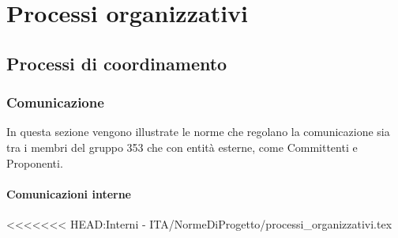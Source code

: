 \documentclass[NormeDiProgetto.tex]{subfiles}
\begin{document}
	\chapter{Processi organizzativi}

	\section{Processi di coordinamento}
	
	\subsection{Comunicazione}
	In questa sezione vengono illustrate le norme che regolano la comunicazione sia tra i membri del gruppo 353 che con entità esterne, come Committenti e Proponenti.
	\subsubsection{Comunicazioni interne}
<<<<<<< HEAD:Interni - ITA/NormeDiProgetto/processi_organizzativi.tex
\end{document}
